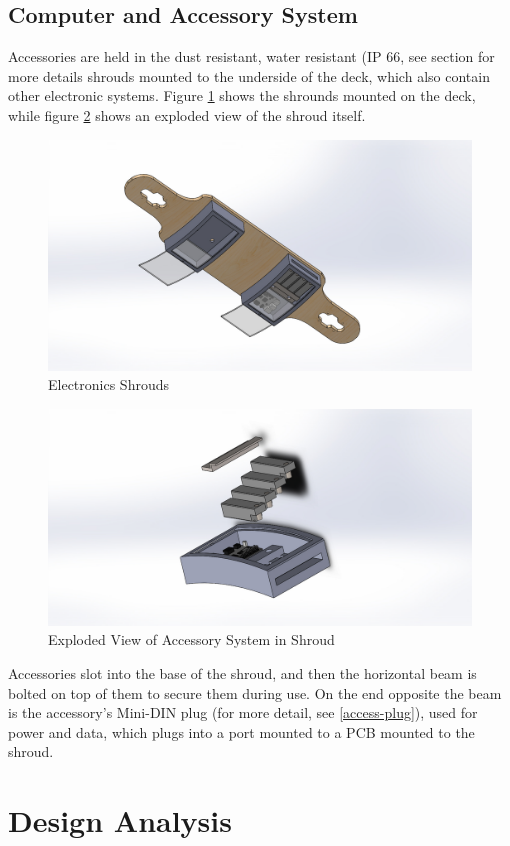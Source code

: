 \documentclass[titlepage, letterpaper,12pt]{article}
\begin{document}
\subsection{Computer and Accessory System}
Accessories are held in the dust resistant, water resistant (IP 66, see section for more details shrouds mounted to the underside of the deck, which also contain other electronic systems. Figure \ref{access-full} shows the shrounds mounted on the deck, while figure \ref{access-expl} shows an exploded view of the shroud itself.

\begin{figure}
  \centering
  \includegraphics[width=.7\linewidth]{ModularAssembledBottomAngle}
  \caption{Electronics Shrouds}
  \label{access-full}
\end{figure}

\begin{figure}\centering
  \includegraphics[width=.7\linewidth]{ModPieceAngleExtend}
  \caption{Exploded View of Accessory System in Shroud}
  \label{access-expl}
\end{figure}

Accessories slot into the base of the shroud, and then the horizontal beam is bolted on top of them to secure them during use. On the end opposite the beam is the accessory's Mini-DIN plug (for more detail, see \ref{access-plug}), used for power and data, which plugs into a port mounted to a PCB mounted to the shroud.

\newpage
\section{Design Analysis}
\end{document}
